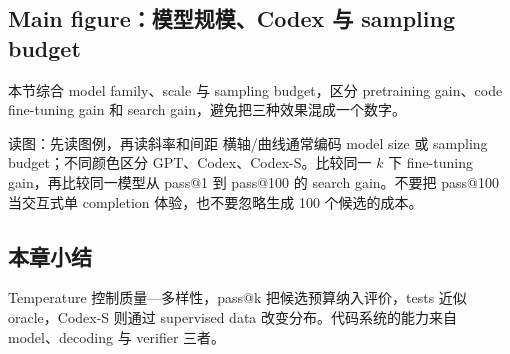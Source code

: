 \subsection{Main figure：模型规模、Codex 与 sampling budget}

本节综合 model family、scale 与 sampling budget，区分 pretraining gain、code fine-tuning gain 和 search gain，避免把三种效果混成一个数字。


\begin{knowledgebox}{读图：先读图例，再读斜率和间距}
横轴/曲线通常编码 model size 或 sampling budget；不同颜色区分 GPT、Codex、Codex-S。比较同一 $k$ 下 fine-tuning gain，再比较同一模型从 pass@1 到 pass@100 的 search gain。不要把 pass@100 当交互式单 completion 体验，也不要忽略生成 100 个候选的成本。
\end{knowledgebox}

\subsection{本章小结}

Temperature 控制质量—多样性，pass@k 把候选预算纳入评价，tests 近似 oracle，Codex-S 则通过 supervised data 改变分布。代码系统的能力来自 model、decoding 与 verifier 三者。

